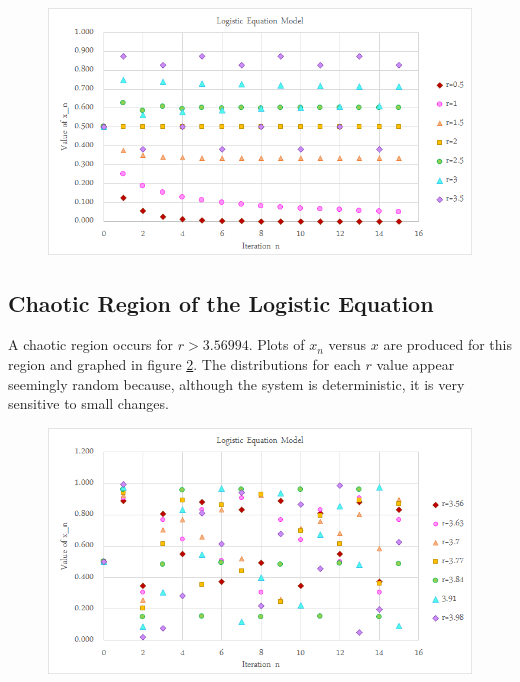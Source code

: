 \documentclass[a4paper]{article}
\begin{document}
\begin{figure}[H]
\centering
\includegraphics[width=1\textwidth]{pdoub.png}
\label{pdoub1}
\end{figure}

\subsection{Chaotic Region of the Logistic Equation}
\qq A chaotic region occurs for $r>3.56994$. Plots of $x_n$ versus $x$ are produced for this region and graphed in figure \ref{chaos1}. The distributions for each $r$ value appear seemingly random because, although the system is deterministic, it is very sensitive to small changes.

\begin{figure}[H]
\centering
\includegraphics[width=1\textwidth]{chaos1.png}
\label{chaos1}
\end{figure}
\end{document}
